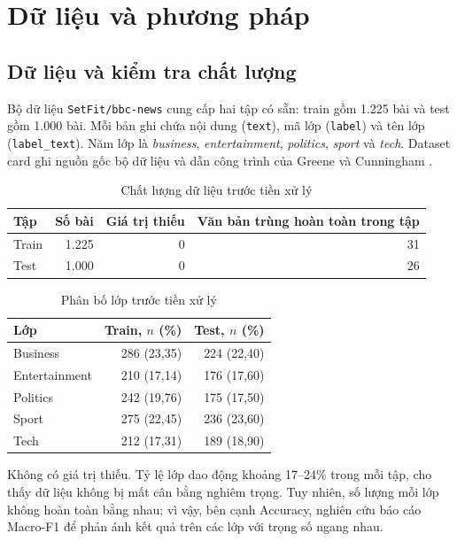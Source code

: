\documentclass[conference,a4paper]{IEEEtran}
\begin{document}
\section{Dữ liệu và phương pháp}

\subsection{Dữ liệu và kiểm tra chất lượng}

Bộ dữ liệu \texttt{SetFit/bbc-news} cung cấp hai tập có sẵn: train gồm 1.225 bài và test gồm 1.000 bài. Mỗi bản ghi chứa nội dung (\texttt{text}), mã lớp (\texttt{label}) và tên lớp (\texttt{label\_text}). Năm lớp là \textit{business}, \textit{entertainment}, \textit{politics}, \textit{sport} và \textit{tech}. Dataset card ghi nguồn gốc bộ dữ liệu và dẫn công trình của Greene và Cunningham \cite{setfit_bbc, greene2006}.

\begin{table}[!t]
\centering
\caption{Chất lượng dữ liệu trước tiền xử lý}
\label{tab:data_quality}
\begin{tabular}{lrrr}
\toprule
\textbf{Tập} & \textbf{Số bài} & \textbf{Giá trị thiếu} & \textbf{Văn bản trùng hoàn toàn trong tập} \\
\midrule
Train & 1.225 & 0 & 31 \\
Test  & 1.000 & 0 & 26 \\
\bottomrule
\end{tabular}
\end{table}

\begin{table}[!t]
\centering
\caption{Phân bố lớp trước tiền xử lý}
\label{tab:class_dist}
\begin{tabular}{lrr}
\toprule
\textbf{Lớp} & \textbf{Train, $n$ (\%)} & \textbf{Test, $n$ (\%)} \\
\midrule
Business      & 286 (23,35) & 224 (22,40) \\
Entertainment & 210 (17,14) & 176 (17,60) \\
Politics      & 242 (19,76) & 175 (17,50) \\
Sport         & 275 (22,45) & 236 (23,60) \\
Tech          & 212 (17,31) & 189 (18,90) \\
\bottomrule
\end{tabular}
\end{table}

Không có giá trị thiếu. Tỷ lệ lớp dao động khoảng 17--24\% trong mỗi tập, cho thấy dữ liệu không bị mất cân bằng nghiêm trọng. Tuy nhiên, số lượng mỗi lớp không hoàn toàn bằng nhau; vì vậy, bên cạnh Accuracy, nghiên cứu báo cáo Macro-F1 để phản ánh kết quả trên các lớp với trọng số ngang nhau.
\end{document}

